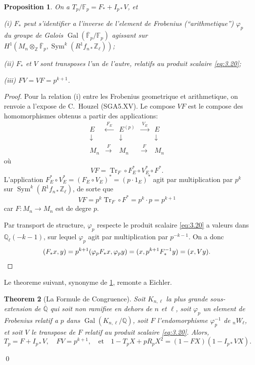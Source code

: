 \documentclass[11pt,reqno]{amsart}
\theoremstyle{plain}
\newtheorem{theorem}{Theorem}[section]
\newtheorem{proposition}[theorem]{Proposition}
\theoremstyle{remark}
\DeclareMathOperator{\Sym}{Sym}
\DeclareMathOperator{\Gal}{Gal}
\DeclareMathOperator{\Tr}{Tr}
\newcommand{\Z}{\mathbb{Z}}
\newcommand{\Q}{\mathbb{Q}}
\newcommand{\F}{\mathbb{F}}
\numberwithin{equation}{section}
\begin{document}
\begin{proposition}\label{prop:4.8}
On a $T_p/\F_p = F_* + I_{p*}V$, et

\textup{(i)} $F_*$ peut s'identifier a l'inverse de l'element de Frobenius (``arithmetique'') $\varphi_p$ du groupe de Galois $\Gal(\overline{\F}_p/\F_p)$ agissant sur $H^1(M_n \otimes_\Z \overline{\F}_p, \Sym^k(R^1f_{n*}\Z_\ell))$;

\textup{(ii)} $F_*$ et $V$ sont transposes l'un de l'autre, relatifs au produit scalaire \eqref{eq:3.20};

\textup{(iii)} $FV = VF = p^{k+1}$.
\end{proposition}

\begin{proof}
Pour la relation (i) entre les Frobenius geometrique et arithmetique, on renvoie a l'expose de C.~Houzel (SGA5.XV). Le compose $VF$ est le compose des homomorphismes obtenus a partir des applications:
\[
\begin{array}{ccccc}
E & \xleftarrow{\;F_E\;} & E^{(p)} & \xrightarrow{\;V_E\;} & E \\
\downarrow & & \downarrow & & \downarrow \\
M_n & \xrightarrow{\;F\;} & M_n & \xrightarrow{\;F\;} & M_n
\end{array}
\]
o\`u
\[
VF = \Tr_F \circ F_E^* \circ V_E^* \circ F^*.
\]
L'application $F_E^* \circ V_E^* = (F_E \circ V_E)^* = (p \cdot 1_E)^*$ agit par multiplication par $p^k$ sur $\Sym^k(R^1f_{n*}\Z_\ell)$, de sorte que
\[
VF = p^k \Tr_F \circ F^* = p^k \cdot p = p^{k+1}
\]
car $F: M_n \to M_n$ est de degre $p$.

Par transport de structure, $\varphi_p$ respecte le produit scalaire \eqref{eq:3.20} a valeurs dans $\Q_\ell(-k-1)$, sur lequel $\varphi_p$ agit par multiplication par $p^{-k-1}$. On a donc
\[
(F_*x, y) = p^{k+1}(\varphi_p F_*x, \varphi_p y) = (x, p^{k+1}F_*^{-1}y) = (x, Vy). \qedhere
\]
\end{proof}

Le theoreme suivant, synonyme de \ref{prop:4.8}, remonte a Eichler.

\begin{theorem}[La Formule de Congruence]\label{thm:congruence}
Soit $K_{n,\ell}$ la plus grande sous-extension de $\overline{\Q}$ qui soit non ramifiee en dehors de $n$ et $\ell$, soit $\varphi_p$ un element de Frobenius relatif a $p$ dans $\Gal(K_{n,\ell}/\Q)$, soit $F$ l'endomorphisme $\varphi_p^{-1}$ de ${}_nW_\ell$, et soit $V$ le transpose de $F$ relatif au produit scalaire \eqref{eq:3.20}. Alors,
\[
T_p = F + I_{p*}V, \quad FV = p^{k+1}, \quad \text{et} \quad 1 - T_pX + pR_pX^2 = (1 - FX)(1 - I_{p*}VX).
\]
\end{theorem}
\qed
\end{document}
